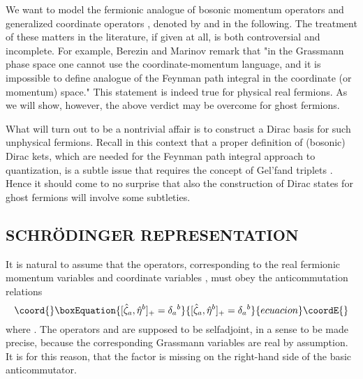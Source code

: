 \documentclass[a4paper,10pt]{article}
\begin{document}
We want to model the fermionic analogue of bosonic momentum operators \coordHE{} and 
generalized coordinate operators \coordHE{}, denoted by \coordHE{} and 
\coordHE{} in the following. The treatment of these matters in the literature, if 
given at all, is both controversial and incomplete. For example, Berezin and Marinov 
\cite{Bere 77} remark that "in the Grassmann phase space one cannot use the 
coordinate-momentum language, and it is impossible to define analogue of the Feynman 
path integral in the coordinate (or momentum) space." This statement is indeed true for 
physical real 
fermions. As we will show, however, the above verdict may be overcome for ghost fermions. 

What will turn out to be a nontrivial affair is to construct a Dirac basis for such 
unphysical fermions. Recall in this context that a proper definition of (bosonic) Dirac 
kets, which are needed for the Feynman path integral approach to quantization, is a subtle issue 
that requires the concept of Gel'fand triplets \cite{Gelf 64,Bohm 89}. Hence it should 
come to no surprise that also the construction of Dirac states for ghost fermions will 
involve some subtleties.

\subsection{SCHR\"{O}DINGER REPRESENTATION}

It is natural to assume that the operators, corresponding to the real fermionic momentum  
variables \coordHE{} and coordinate variables \coordHE{}, must obey the anticommutation 
relations
\begin{equation}\coord{}\boxEquation{\label{relationsunphysicalfermions}
[\hat{\zeta}_a,\hat{\eta}^b]_+=\delta_a{}^b
}{[\hat{\zeta}_a,\hat{\eta}^b]_+=\delta_a{}^b
}{ecuacion}\coordE{}\end{equation}
where \coordHE{}. The operators \coordHE{} and \coordHE{} are 
supposed to be selfadjoint, in a sense to be made precise, because the corresponding 
Grassmann variables are real by assumption. It is for this reason, that the factor 
\coordHE{} is missing on the right-hand side of the basic anticommutator. 
\end{document}
